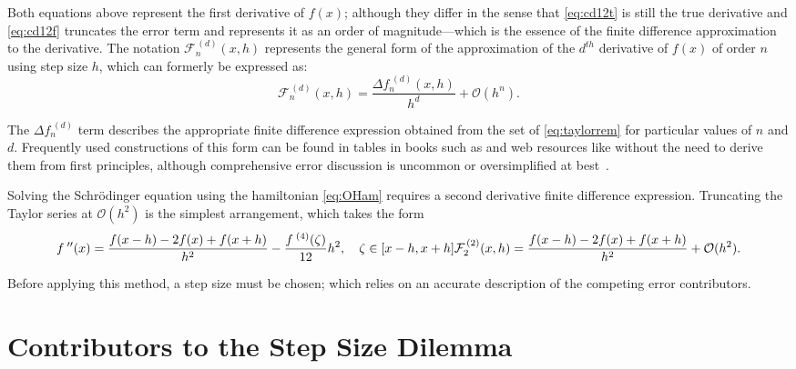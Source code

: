 Both equations above represent the first derivative of $f(x)$; although they differ in the sense that \cref{eq:cd12t} is still the true derivative and \cref{eq:cd12f} truncates the error term and represents it as an order of magnitude---which is the essence of the finite difference approximation to the derivative.
The notation $\mathcal{F}_n^{\,(d)}(x,h)$ represents the general form of the approximation of the $d^{th}$ derivative of $f(x)$ of order $n$ using step size $h$, which can formerly be expressed as:
\begin{equation}
\mathcal{F}_n^{\,(d)}(x,h) = \frac{\Delta f_n^{\;(d)}(x,h)}{h^d} + \mathcal{O}(h^n).\label{eq:cdgeneral}
\end{equation}

The $\Delta f_n^{\;(d)}$ term describes the appropriate finite difference expression obtained from the set of \cref{eq:taylorrem} for particular values of $n$ and $d$.
Frequently used constructions of this form can be found in tables in books such as \citeauthor{Mathews2004} and web resources like \citeauthor{Holoborodko2009} without the need to derive them from first principles, although comprehensive error discussion is uncommon or oversimplified at best~\cite{Mathews2004,Holoborodko2009}.

Solving the Schr\"{o}dinger equation using the hamiltonian \cref{eq:OHam} requires a second derivative finite difference expression.
Truncating the Taylor series at $\mathcal{O}(h^2)$ is the simplest arrangement, which takes the form
\begin{equation}
f^{\;\prime\prime}(x) = \frac{f(x-h)-2f(x)+f(x+h)}{h^2} - \frac{f^{\;(4)}(\zeta)}{12}h^2, \quad \zeta \in [x-h,x+h]\label{eq:cd22t} \\
\mathcal{F}_2^{\,(2)}(x,h) = \frac{f(x-h)-2f(x)+f(x+h)}{h^2} + \mathcal{O}(h^2).\label{eq:cd22f}
\end{equation}

Before applying this method, a step size must be chosen; which relies on an accurate description of the competing error contributors.

\section{Contributors to the Step Size Dilemma}

